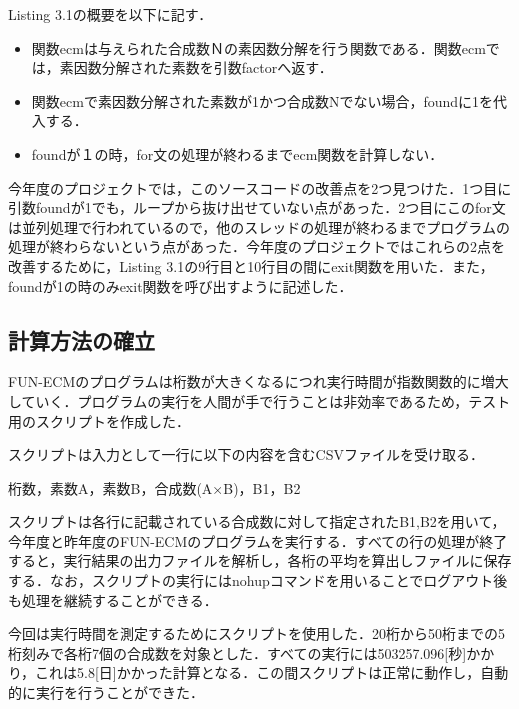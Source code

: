 \documentclass[openany,11pt,papersize]{jsbook}
\begin{document}
Listing 3.1の概要を以下に記す．

\begin{itemize}
 \item 関数ecmは与えられた合成数Ｎの素因数分解を行う関数である．関数ecmでは，素因数分解された素数を引数factorへ返す．
 \item 関数ecmで素因数分解された素数が1かつ合成数Nでない場合，foundに1を代入する．
 \item foundが１の時，for文の処理が終わるまでecm関数を計算しない．
\end{itemize}

今年度のプロジェクトでは，このソースコードの改善点を2つ見つけた．1つ目に引数foundが1でも，ループから抜け出せていない点があった．2つ目にこのfor文は並列処理で行われているので，他のスレッドの処理が終わるまでプログラムの処理が終わらないという点があった．今年度のプロジェクトではこれらの2点を改善するために，Listing 3.1の9行目と10行目の間にexit関数を用いた．また，foundが1の時のみexit関数を呼び出すように記述した．


\subsection{計算方法の確立}\label{sec:alg3}
FUN-ECMのプログラムは桁数が大きくなるにつれ実行時間が指数関数的に増大していく．プログラムの実行を人間が手で行うことは非効率であるため，テスト用のスクリプトを作成した．\par

スクリプトは入力として一行に以下の内容を含むCSVファイルを受け取る．\par

\begin{center}桁数，素数A，素数B，合成数(A×B)，B1，B2\end{center}

スクリプトは各行に記載されている合成数に対して指定されたB1,B2を用いて，今年度と昨年度のFUN-ECMのプログラムを実行する．すべての行の処理が終了すると，実行結果の出力ファイルを解析し，各桁の平均を算出しファイルに保存する．なお，スクリプトの実行にはnohupコマンドを用いることでログアウト後も処理を継続することができる．\par

今回は実行時間を測定するためにスクリプトを使用した．20桁から50桁までの5桁刻みで各桁7個の合成数を対象とした．すべての実行には503257.096[秒]かかり，これは5.8[日]かかった計算となる．この間スクリプトは正常に動作し，自動的に実行を行うことができた．\par
\end{document}

